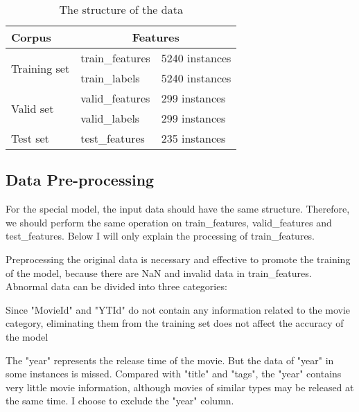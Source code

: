 \documentclass[11pt]{article}
\begin{document}

\begin{table}[h]
 \begin{center}
\begin{tabular}{|l|l|l|}

      \hline
      Corpus & \multicolumn{2}{|c|}{Features}\\
      \hline\hline
      \multirow{2}{5.5em}{Training set} & train\_features & 5240 instances\\
      &train\_labels & 5240 instances\\
      \hline
      \multirow{2}{5.5em}{Valid set} & valid\_features & 299 instances\\
      &valid\_labels & 299 instances\\
      \hline
      Test set & test\_features & 235 instances\\
      \hline

\end{tabular}
\caption{The structure of the data}\label{table1}
 \end{center}
\end{table}

\subsection{Data Pre-processing}

For the special model, the input data should have the same structure. Therefore, we should perform the same operation on train\_features, valid\_features and test\_features. Below I will only explain the processing of train\_features.

Preprocessing the original data is necessary and effective to promote the training of the model, because there are NaN and invalid data in train\_features. Abnormal data can be divided into three categories:

Since "MovieId" and "YTId" do not contain any information related to the movie category, eliminating them from the training set does not affect the accuracy of the model

The "year" represents the release time of the movie. But the data of "year" in some instances is missed. Compared with "title" and "tags", the "year" contains very little movie information, although movies of similar types may be released at the same time. I choose to exclude the "year" column.
\end{document}
